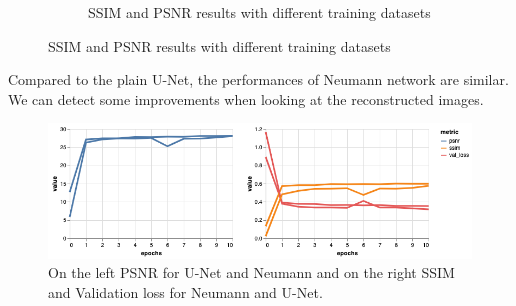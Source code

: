 \documentclass{article}
\begin{document}
\begin{figure}[H]
\begin{subfigure}[b]{.5\textwidth}
		\caption{SSIM and PSNR results with different training datasets}
    \end{subfigure}%
\end{figure}

Compared to the plain U-Net, the performances of Neumann network are similar. We can detect some improvements when looking at the  reconstructed images.
	\begin{figure}[H]
		\centering
		\captionsetup{justification=centering}
		\includegraphics[width=\textwidth]{unet_neumann}
		\caption{On the left PSNR for U-Net and Neumann and on the right SSIM and Validation loss for Neumann and U-Net.}
	\end{figure}
\end{document}
